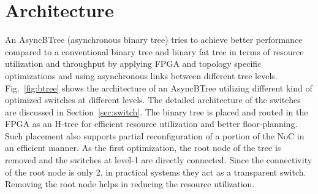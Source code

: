 \section{Architecture}
\label{sec:arch}


An AsyncBTree (asynchronous binary tree) tries to achieve better performance compared to a conventional binary tree and binary fat tree in terms of resource utilization and throughput by applying FPGA and topology specific optimizations and using asynchronous links between different tree levels.
Fig.~\ref{fig:btree} shows the architecture of an AsyncBTree utilizing different kind of optimized switches at different levels.
The detailed architecture of the switches are discussed in Section~\ref{sec:switch}.
The binary tree is placed and routed in the FPGA as an H-tree for efficient resource utilization and better floor-planning.
Such placement also supports partial reconfiguration of a portion of the NoC in an efficient manner.
As the first optimization, the root node of the tree is removed and the switches at level-1 are directly connected.
Since the connectivity of the root node is only 2, in practical systems they act as a transparent switch.
Removing the root node helps in reducing the resource utilization.

